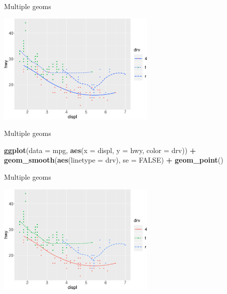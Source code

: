 \documentclass[ignorenonframetext,]{beamer}
\newenvironment{Shaded}{\begin{snugshade}}{\end{snugshade}}
\newcommand{\DataTypeTok}[1]{\textcolor[rgb]{0.13,0.29,0.53}{#1}}
\newcommand{\KeywordTok}[1]{\textcolor[rgb]{0.13,0.29,0.53}{\textbf{#1}}}
\newcommand{\NormalTok}[1]{#1}
\newcommand{\OperatorTok}[1]{\textcolor[rgb]{0.81,0.36,0.00}{\textbf{#1}}}
\newcommand{\OtherTok}[1]{\textcolor[rgb]{0.56,0.35,0.01}{#1}}
\newcommand{\StringTok}[1]{\textcolor[rgb]{0.31,0.60,0.02}{#1}}
\begin{document}
\begin{frame}{Multiple geoms}
\protect\hypertarget{multiple-geoms-13}{}

\begin{center}\includegraphics[height=200px]{data-visualization_files/figure-beamer/unnamed-chunk-91-1} \end{center}

\end{frame}

\begin{frame}[fragile]{Multiple geoms}
\protect\hypertarget{multiple-geoms-14}{}

\begin{Shaded}
\begin{Highlighting}[]
\KeywordTok{ggplot}\NormalTok{(}\DataTypeTok{data =}\NormalTok{ mpg, }\KeywordTok{aes}\NormalTok{(}\DataTypeTok{x =}\NormalTok{ displ, }\DataTypeTok{y =}\NormalTok{ hwy, }
                       \DataTypeTok{color =}\NormalTok{ drv)) }\OperatorTok{+}
\StringTok{  }\KeywordTok{geom_smooth}\NormalTok{(}\KeywordTok{aes}\NormalTok{(}\DataTypeTok{linetype =}\NormalTok{ drv), }\DataTypeTok{se =} \OtherTok{FALSE}\NormalTok{) }\OperatorTok{+}
\StringTok{  }\KeywordTok{geom_point}\NormalTok{()}
\end{Highlighting}
\end{Shaded}

\end{frame}

\begin{frame}{Multiple geoms}
\protect\hypertarget{multiple-geoms-15}{}

\begin{center}\includegraphics[height=200px]{data-visualization_files/figure-beamer/unnamed-chunk-93-1} \end{center}

\end{frame}
\end{document}
